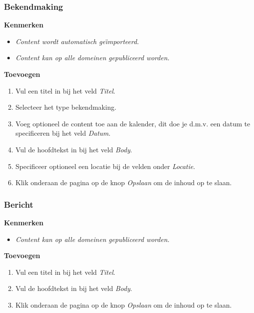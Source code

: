 \subsubsection{Bekendmaking}\label{bekendmaking}

\textbf{Kenmerken}

\begin{itemize}
\item \emph{Content wordt automatisch ge{\"\i}mporteerd.}
\item \emph{Content kan op alle domeinen gepubliceerd worden.}
\end{itemize}

\textbf{Toevoegen}

\begin{enumerate}
\item Vul een titel in bij het veld \emph{Titel}.
\item Selecteer het type bekendmaking.
\item Voeg optioneel de content toe aan de kalender, dit doe je d.m.v. een datum te specificeren bij het veld \emph{Datum}.
\item Vul de hoofdtekst in bij het veld \emph{Body}.
\item Specificeer optioneel een locatie bij de velden onder \emph{Locatie}.
\item Klik onderaan de pagina op de knop \emph{Opslaan} om de inhoud op te slaan.
\end{enumerate}

\subsubsection{Bericht}\label{bericht}

\textbf{Kenmerken}

\begin{itemize}
\item \emph{Content kan op alle domeinen gepubliceerd worden.}
\end{itemize}

\textbf{Toevoegen}

\begin{enumerate}
\item Vul een titel in bij het veld \emph{Titel}.
\item Vul de hoofdtekst in bij het veld \emph{Body}.
\item Klik onderaan de pagina op de knop \emph{Opslaan} om de inhoud op te slaan.
\end{enumerate}

